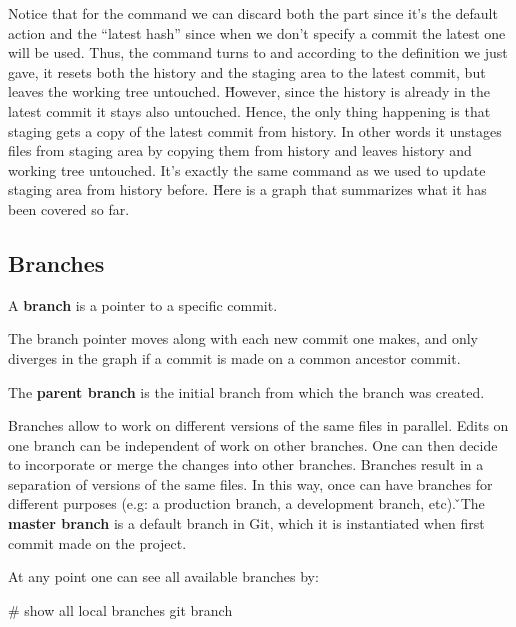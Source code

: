 Notice that for the command  we can discard both the  part
since it's the default action and the ``latest hash'' since when we don't specify a commit the latest one will be
used. Thus, the command turns to  and according to the definition we just gave, it resets both the
history and the staging area to the latest commit, but leaves the working tree untouched. \v

However, since the history is already in the latest commit it stays also untouched. Hence, the only thing happening
is that staging gets a copy of the latest commit from history. In other words it unstages files from staging area by
copying them from history and leaves history and working tree untouched. It's exactly the same command as we used to
update staging area from history before. \v

Here is a graph that summarizes what it has been covered so far.


\subsection{Branches}

\bd[Branch]
A \textbf{branch} is a pointer to a specific commit.
\ed

The branch pointer moves along with each new commit one makes, and only diverges in the graph if a commit is made on a
common ancestor commit.

The \textbf{parent branch} is the initial branch from which the branch was created.
\ed

Branches allow to work on different versions of the same files in parallel. Edits on one branch can be independent of
work on other branches. One can then decide to incorporate or merge the changes into other branches. Branches result
in a separation of versions of the same files. In this way, once can have branches for different purposes (e.g: a
production branch, a development branch, etc). \v

The \textbf{master branch} is a default branch in Git, which it is instantiated when first commit made on the project.
\ed

At any point one can see all available branches by:

\begin{bash}
# show all local branches
git branch
\end{bash}

